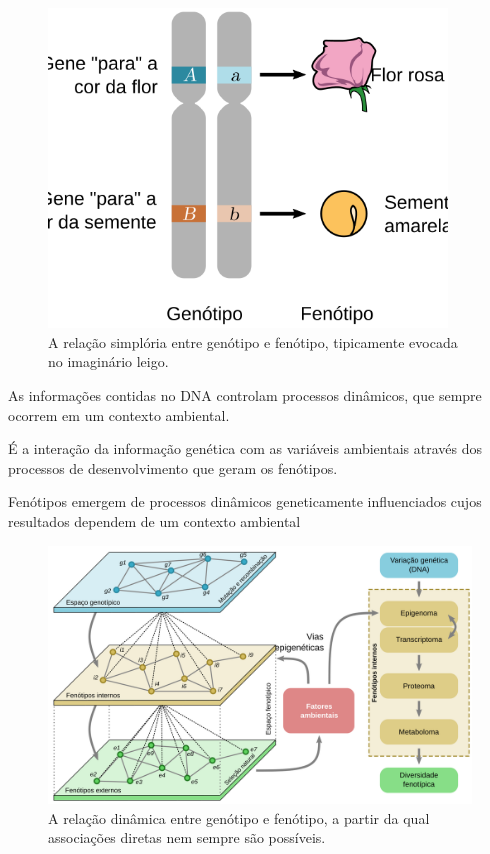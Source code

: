 \documentclass[
]{book}
\begin{document}
\begin{figure}

{\centering \includegraphics[width=400px]{figs/genotype_phenotype_oversimplified} 

}

\caption{A relação simplória entre genótipo e fenótipo, tipicamente evocada no imaginário leigo.}\label{fig:simplephenotype}
\end{figure}

As informações contidas no DNA controlam processos dinâmicos, que sempre ocorrem em um contexto ambiental.

É a interação da informação genética com as variáveis ambientais através dos processos de desenvolvimento que geram os fenótipos.

Fenótipos emergem de processos dinâmicos geneticamente influenciados cujos resultados dependem de um contexto ambiental

\begin{figure}

{\centering \includegraphics[width=800px]{figs/genotype_phenotype_dynamics} 

}

\caption{A relação dinâmica entre genótipo e fenótipo, a partir da qual associações diretas nem sempre são possíveis.}\label{fig:dynamicphenotype}
\end{figure}
\end{document}

